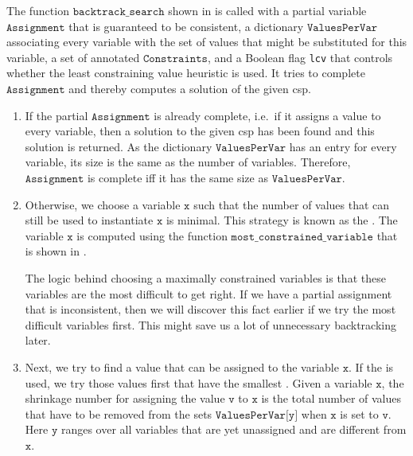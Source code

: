 The function $\texttt{backtrack\_search}$ shown in  is called with a
partial variable $\texttt{Assignment}$ that is guaranteed to be consistent, a dictionary
$\texttt{ValuesPerVar}$ associating every variable with the set of values that might be substituted for this variable, a
set of annotated $\texttt{Constraints}$, and a Boolean flag \texttt{lcv} that controls whether the
least constraining value heuristic is used.  It tries to complete $\texttt{Assignment}$ and thereby computes a
solution of the given \ac{csp}.  
\begin{enumerate}
\item If the partial $\texttt{Assignment}$ is already complete, i.e.~if it assigns a value to every variable, 
      then a solution to the given \ac{csp} has been found and this solution is returned.  As the
      dictionary $\texttt{ValuesPerVar}$ has an entry for every variable, its size is the same as the number of
      variables. Therefore, $\texttt{Assignment}$ is complete iff it has the same size as $\texttt{ValuesPerVar}$.
\item Otherwise, we choose a variable $\texttt{x}$ such that the number of values that can still be used to
      instantiate $\texttt{x}$ is minimal.  This strategy is known as the . 
      The variable $\texttt{x}$ is computed using the function
      $\texttt{most\_constrained\_variable}$ that is shown in .
      
      The logic behind choosing a maximally constrained variables is that these variables are the most
      difficult to get right.  If we have a partial assignment that is inconsistent, then we will discover this
      fact earlier if we try the most difficult variables first.  This might save us a lot of unnecessary
      backtracking later. 
\item Next, we try to find a value that can be assigned to the variable $\texttt{x}$.
      If the  is used, we try those values first that have the
      smallest .  Given a variable $\texttt{x}$, the shrinkage number for assigning the
      value $\texttt{v}$ to $\texttt{x}$ is the total number of values 
      that have to be removed from the sets $\texttt{ValuesPerVar[y]}$ when $\texttt{x}$ is set to $\texttt{v}$.
      Here $\texttt{y}$ ranges over all variables that are yet unassigned and are different from $\texttt{x}$.


\end{enumerate}
